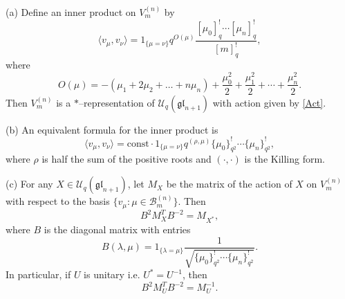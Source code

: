 \documentclass{ximera}
\begin{document}
\begin{lemma}\label{FirstLemma}
(a)
Define an inner product on $V_m^{(n)}$ by 
$$
\langle v_{\mu},v_{\nu}\rangle = 1_{\{\mu=\nu\}} q^{O(\mu)} \frac{[\mu_0]_q^! \cdots [\mu_n]_q^!}{[m]_q^!},
$$
where
$$
  O(\mu) = -( \mu_1 + 2\mu_2 + \ldots + n \mu_n )+ \frac{\mu_0^2}{2} + \frac{\mu_1^2}{2} + \cdots + \frac{\mu_n^2}{2}.
$$
Then $V_m^{(n)}$ is a $*$--representation of $\mathcal{U}_q(\mathfrak{gl}_{n+1})$ with action given by \eqref{Act}. 

(b) An equivalent formula  for the inner product is
$$
\langle v_{\mu},v_{\nu} \rangle = \mathrm{const} \cdot 1_{\{\mu=\nu\}} q^{(\rho,\mu)} \{\mu_0\}_{q^2}^! \cdots \{\mu_n\}_{q^2}^!,
$$
where $\rho$ is half the sum of the positive roots and $(\cdot,\cdot)$ is the Killing form.

(c) For any $X\in \mathcal{U}_q(\mathfrak{gl}_{n+1})$, let $M_X$ be the matrix of the action of $X$ on $V_m^{(n)}$ with respect to the basis $\{v_{\mu}: \mu \in \mathcal{B}_m^{(n)}\}$. Then
$$
B^2 M_X^T B^{-2}   = M_{X^*},
$$
where $B$ is the diagonal matrix with entries $$B(\lambda,\mu) = 1_{\{\lambda=\mu\}} \frac{1}{\sqrt{\{\mu_0\}_{q^2}^! \cdots \{\mu_n\}_{q^2}^!}}.$$
In particular, if $U$ is unitary i.e. $U^*=U^{-1}$, then
$$
B^2 M_U^T B^{-2}   = M_{U}^{-1}.
$$
\end{lemma}
\end{document}
